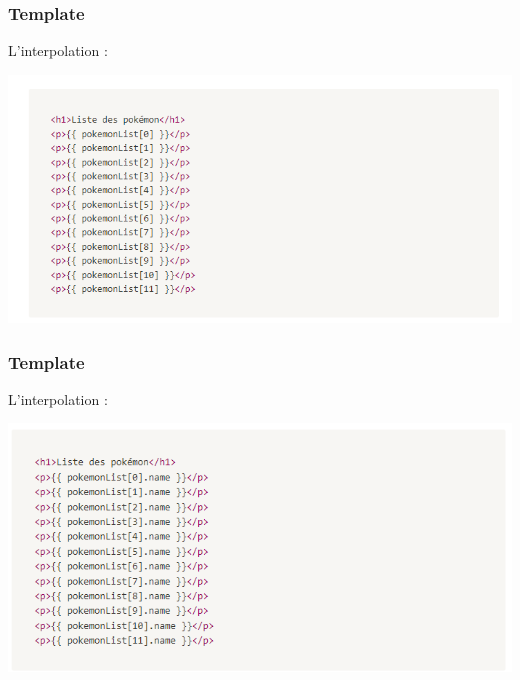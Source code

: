 \documentclass[10pt]{beamer}
\begin{document}
	\begin{frame}
		\frametitle{Template}

		L'interpolation : \newline \newline


		\centering
		\includegraphics[width=14cm]{assets/inter} \newline


	\end{frame}

	\begin{frame}
		\frametitle{Template}

		L'interpolation : \newline \newline


		\centering
		\includegraphics[width=14cm]{assets/inter2} \newline


	\end{frame}
\end{document}
